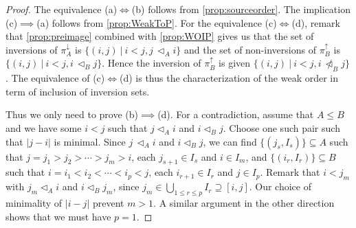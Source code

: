 \documentclass[reqno]{amsart}
\theoremstyle{definition}
\newcommand{\less}{\vartriangleleft} %
\newcommand{\projDown}{\pi^\downarrow} %
\newcommand{\projUp}{\pi^\uparrow} %
\begin{document}
\begin{proof}
The equivalence (a)$\iff$(b) follows from \cref{prop:sourceorder}.
The implication (c)$\implies$(a) follows from  \cref{prop:WeakToP}.
For the equivalence (c)$\iff$(d), remark that \cref{prop:preimage} combined with \cref{prop:WOIP} gives us that the set of inversions of $\projDown_A$ is $\big\{(i,j)\ |\  i<j, j\,\less_Ai \big\}$ and the set of non-inversions of $\projUp_B$ is  $\big\{(i,j)\ |\  i<j, i\,\less_B j \big\}$.
Hence the inversion of $\projUp_B$ is  given $\big\{(i,j)\ |\  i<j, i\,\not\less_B j \big\}$.
The equivalence of (c)$\iff$(d) is thus the characterization of the weak order in term of inclusion of inversion sets.

Thus we only need to prove (b)$\implies$(d).
For a contradiction, assume that $A\le B$ and we have some $i<j$ such that $j\less_Ai$ and  $i \less_B j$.
Choose one such pair such that $|j-i|$ is minimal.
Since $j\,\less_A i$ and $i \less_B j$, we can find $\{(j_s,I_{s})\}\subseteq A$ such that $j=j_1>j_2>\cdots>j_m>i$, each $j_{s+1}\in I_s$ and $i\in I_m$, and $\{(i_r,I_{r})\}\subseteq B$ such that $i=i_1<i_2<\cdots<i_p<j$, each $i_{r+1}\in I_r$ and $j\in I_p$.
Remark that $i<j_m$ with $j_m\less_A i$ and $i\less_B j_m$, since $j_m\in \bigcup_{1\le r\le p}I_r\supseteq [i,j]$.
Our choice of minimality of $|i-j|$ prevent $m>1$.
A similar argument in the other direction shows that we must have $p=1$.


\end{proof}
\end{document}
